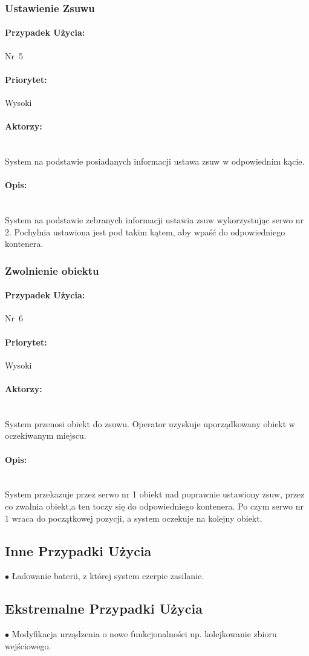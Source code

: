 \documentclass[12pt]{article}
\begin{document}
\subsubsection{Ustawienie Zsuwu}
\paragraph{Przypadek Użycia:}\mbox{Nr 5}
\paragraph{Priorytet:}\mbox{Wysoki}	
\paragraph{Aktorzy:}\mbox{} \\
System na podstawie posiadanych informacji ustawa zsuw w odpowiednim kącie.
\paragraph{Opis:}\mbox{} \\
System na podstawie zebranych informacji ustawia zsuw wykorzystując serwo nr 2. Pochylnia ustawiona jest pod takim kątem, aby wpaść do odpowiedniego kontenera.

\subsubsection{Zwolnienie obiektu}
\paragraph{Przypadek Użycia:}\mbox{Nr 6}
\paragraph{Priorytet:}\mbox{Wysoki}	
\paragraph{Aktorzy:}\mbox{} \\
System przenosi obiekt do zsuwu. 
Operator uzyskuje uporządkowany obiekt w oczekiwanym miejscu.
\paragraph{Opis:}\mbox{} \\
System przekazuje przez serwo nr 1 obiekt nad poprawnie ustawiony zsuw, przez  co zwalnia obiekt,a ten toczy się do odpowiedniego kontenera. Po czym serwo nr 1 wraca do początkowej pozycji, a system oczekuje na kolejny obiekt.
\subsection{Inne Przypadki Użycia}
$\bullet$ Ładowanie baterii, z której system czerpie zasilanie.\\
\subsection{Ekstremalne Przypadki Użycia}
$\bullet$ Modyfikacja urządzenia o nowe funkcjonalności np. kolejkowanie zbioru wejściowego.\\
\end{document}
